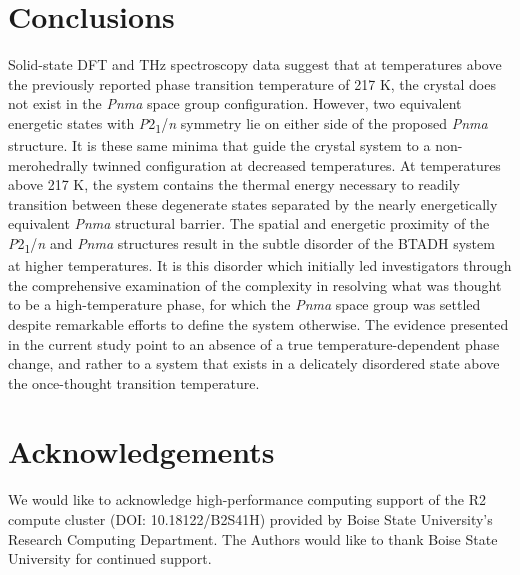 \section{Conclusions}
Solid-state DFT and THz spectroscopy data suggest that at temperatures above the previously reported phase transition temperature of 217 K, the crystal does not exist in the \textit{Pnma} space group configuration. However, two equivalent energetic states with \textit{P}2\textsubscript{1}/\textit{n} symmetry lie on either side of the proposed \textit{Pnma} structure. It is these same minima that guide the crystal system to a non-merohedrally twinned configuration at decreased temperatures. At temperatures above 217 K, the system contains the thermal energy necessary to readily transition between these degenerate states separated by the nearly energetically equivalent \textit{Pnma} structural barrier. The spatial and energetic proximity of the \textit{P}2\textsubscript{1}/\textit{n} and \textit{Pnma} structures result in the subtle disorder of the BTADH system at higher temperatures. It is this disorder which initially led investigators through the comprehensive examination of the complexity in resolving what was thought to be a high-temperature phase, for which the \textit{Pnma} space group was settled despite remarkable efforts to define the system otherwise. The evidence presented in the current study point to an absence of a true temperature-dependent phase change, and rather to a system that exists in a delicately disordered state above the once-thought transition temperature.

\section{Acknowledgements}
We would like to acknowledge high-performance computing support of the R2 compute cluster (DOI: 10.18122/B2S41H) provided by Boise State University’s Research Computing Department. The Authors would like to thank Boise State University for continued support. 